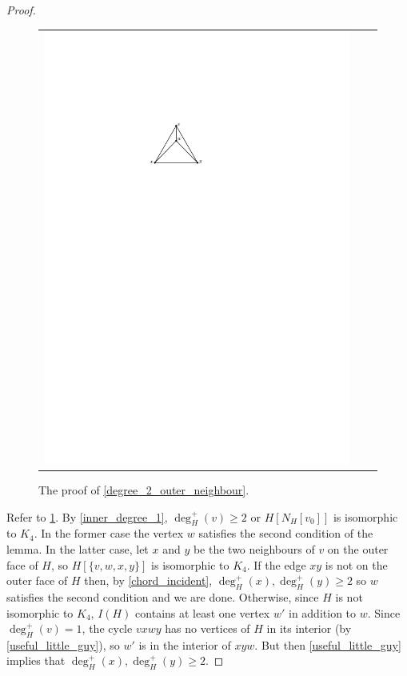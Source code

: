 \documentclass{article}
\newcommand{\pat}[1]{\textcolor{red}{PM: #1}}
\theoremstyle{definition}
\begin{document}
\begin{proof}
\begin{figure}[htbp]
\begin{tabular}{ccc}
       \includegraphics[page=3]{figs/outer_2_2}
     \end{tabular}
     \caption{The proof of \cref{degree_2_outer_neighbour}.}
     \label{degree_2_outer_neighbour_fig}
   \end{figure}

   Refer to \cref{degree_2_outer_neighbour_fig}.
   By \cref{inner_degree_1}, $\deg^+_H(v)\ge 2$ or $H[N_H[v_0]]$ is isomorphic to $K_4$. In the former case the vertex $w$ satisfies the second condition of the lemma.  In the latter case, let $x$ and $y$ be the two neighbours of $v$ on the outer face of $H$, so $H[\{v,w,x,y\}]$ is isomorphic to $K_4$.    If the edge $xy$ is not on the outer face of $H$ then, by \cref{chord_incident}, $\deg^+_H(x),\deg^+_H(y)\ge 2$ so $w$ satisfies the second condition and we are done. Otherwise, since $H$ is not isomorphic to $K_4$, $I(H)$ contains at least one vertex $w'$ in addition to $w$. Since $\deg^+_H(v)=1$, the cycle $vxwy$ has no vertices of $H$ in its interior (by \cref{useful_little_guy}), so $w'$ is in the interior of $xyw$.  But then \cref{useful_little_guy} implies that $\deg^+_H(x),\deg^+_H(y)\ge 2$.
\end{proof}
\end{document}
